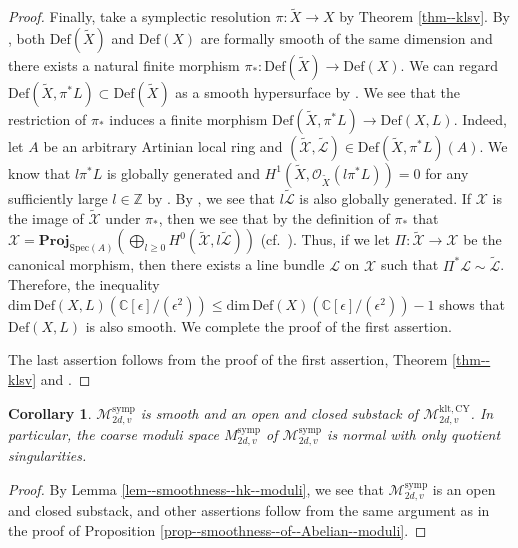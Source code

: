 \documentclass[12pt,twoside]{amsart}
\newtheorem{cor}[thm]{Corollary}
\theoremstyle{definition}
\begin{document}
\begin{proof}
    Finally, take a symplectic resolution $\pi\colon \tilde{X}\to X$ by Theorem \ref{thm--klsv}.
    By \cite[Theorem 1]{Nam2}, both $\mathrm{Def}(\tilde{X})$ and $\mathrm{Def}(X)$ are formally smooth of the same dimension and there exists a natural finite morphism $\pi_*\colon \mathrm{Def}(\tilde{X}) \to \mathrm{Def}(X)$.
    We can regard $\mathrm{Def}(\tilde{X},\pi^*L)\subset\mathrm{Def}(\tilde{X})$ as a smooth hypersurface by \cite[1.14]{huybrechts}.
    We see that the restriction of $\pi_*$ induces a finite morphism $\mathrm{Def}(\tilde{X},\pi^*L)\to \mathrm{Def}(X,L)$.
    Indeed, let $A$ be an arbitrary Artinian local ring and $(\widetilde{\mathcal{X}},\widetilde{\mathcal{L}})\in \mathrm{Def}(\tilde{X},\pi^*L)(A)$. 
    We know that $l \pi^*L$ is globally generated and $H^1(\tilde{X},\mathcal{O}_{\tilde{X}}(l\pi^*L))=0$ for any sufficiently large $l\in\mathbb{Z}$ by \cite[Theorem 3.1]{KM}.
    By \cite[III, Theorem 12.11]{Ha}, we see that $l\widetilde{\mathcal{L}}$ is also globally generated.
    If $\mathcal{X}$ is the image of $\widetilde{\mathcal{X}}$ under $\pi_*$, then we see that by the definition of $\pi_*$ that $\mathcal{X}=\mathbf{Proj}_{\mathrm{Spec}(A)}(\bigoplus_{l\ge0}H^0(\widetilde{\mathcal{X}},l\widetilde{\mathcal{L}}))$ (cf.~\cite[Lemma 1.2]{Wahl}).
    Thus, if we let $\Pi\colon \widetilde{\mathcal{X}}\to\mathcal{X}$ be the canonical morphism, then there exists a line bundle $\mathcal{L}$ on $\mathcal{X}$ such that $\Pi^*\mathcal{L}\sim\widetilde{\mathcal{L}}$.
    Therefore, the inequality $\mathrm{dim}\, \mathrm{Def}(X,L)(\mathbb{C}[\epsilon]/(\epsilon^2))\le \mathrm{dim}\, \mathrm{Def}(X)(\mathbb{C}[\epsilon]/(\epsilon^2))-1$
    shows that $\mathrm{Def}(X,L)$ is also smooth.
    We complete the proof of the first assertion.

    The last assertion follows from the proof of the first assertion, Theorem \ref{thm--klsv} and \cite[Proposition 22.7]{GHJ}.
\end{proof}

\begin{cor}\label{cor--hk--moduli--normal}
    $\mathcal{M}^{\mathrm{symp}}_{2d,v}$ is smooth and an open and closed substack of $\mathcal{M}^{\mathrm{klt,CY}}_{2d,v}$.
    In particular, the coarse moduli space $M^{\mathrm{symp}}_{2d,v}$ of $\mathcal{M}^{\mathrm{symp}}_{2d,v}$ is normal with only quotient singularities.
\end{cor}

\begin{proof}
By Lemma \ref{lem--smoothness--hk--moduli}, we see that $\mathcal{M}^{\mathrm{symp}}_{2d,v}$ is an open and closed substack, and other assertions follow from the same argument as in the proof of Proposition \ref{prop--smoothness--of--Abelian--moduli}.
\end{proof}
\end{document}

